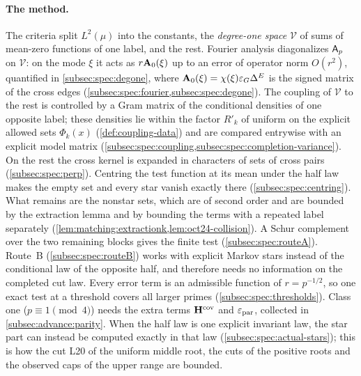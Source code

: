 \paragraph{The method.}
The criteria split $L^2(\mu)$ into the constants, the \emph{degree-one space}
$\mathcal V$ of sums of mean-zero functions of one label, and the rest.
Fourier analysis diagonalizes $\mathsf A_p$ on $\mathcal V$: on the mode
$\xi$ it acts as $r\mathbf A_{0}(\xi)$ up to an error of operator norm
$O(r^2)$, quantified in \cref{subsec:spec:degone}, where
$\mathbf A_{0}(\xi)=\chi(\xi)\varepsilon_G\Delta^E$ is the
signed matrix of the cross edges (\cref{subsec:spec:fourier,subsec:spec:degone}).
The coupling of $\mathcal V$ to the rest is controlled by a Gram matrix of the
conditional densities of one opposite label; these densities lie within the factor $R'_k$ of uniform on the explicit allowed sets $\Phi_k(x)$ (\cref{def:coupling-data}) and are compared entrywise with an explicit
model matrix (\cref{subsec:spec:coupling,subsec:spec:completion-variance}). On
the rest the cross kernel is expanded in characters of sets of cross pairs
(\cref{subsec:spec:perp}). Centring the test function at its mean under the
half law makes the empty set and every star vanish exactly there
(\cref{subsec:spec:centring}). What remains are the nonstar sets, which are
of second order and are bounded by the extraction lemma and by bounding the terms with a repeated label separately
(\cref{lem:matching:extractionk,lem:oct24-collision}). A Schur complement over
the two remaining blocks gives the finite test (\cref{subsec:spec:routeA}).
Route~B (\cref{subsec:spec:routeB}) works with explicit Markov stars instead of
the conditional law of the opposite half, and therefore needs no information
on the completed cut law. Every error term is an admissible function of
$r=p^{-1/2}$, so one exact test at a threshold covers all larger primes
(\cref{subsec:spec:thresholds}). Class one ($p\equiv1\pmod4$) needs the extra terms $\mathbf H^{\rm cov}$ and $\varepsilon_{\rm par}$, collected in \cref{subsec:advance:parity}. When the half law is
one explicit invariant law, the star part can instead be computed exactly in
that law (\cref{subsec:spec:actual-stars}); this is how the cut L20 of the
uniform middle root, the cuts of the positive roots and the observed caps of
the upper range are bounded.

